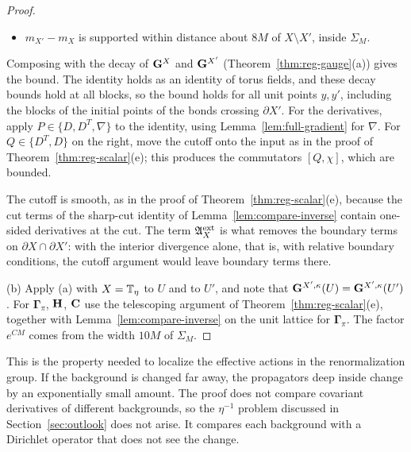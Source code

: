 \begin{proof}
\begin{itemize}
\[
[X_i^TM_iY_i,\chi]=[X_i^T,\chi]M_iY_i+X_i^T[M_i,\chi]Y_i+X_i^TM_i[Y_i,\chi].
\]
The commutators of $D$ and $D^T$ with $\chi$ are bounded and supported where $\partial\chi\ne0$. If $M_i$ has decay $(C,\gamma)$, then $\|\one_y[M_i,\chi]\one_{y'}\|\le2Ce^{-\gamma|y-y'|}$, and it vanishes unless $y$ or $y'$ lies within distance $3+\sqrt d$ of $X\setminus X'$; so $[M_i,\chi]$ has the seam form. The derivative $X_i^T$ on the left is absorbed by $\bG^{X'}$, since $\bG^{X'}D^T$ and $\bG^{X'}D$ decay (Theorem~\ref{thm:reg-gauge}(a)). The derivative $Y_i$ on the right falls on $u$, and $D\bG^X$, $D^T\bG^X$ decay. With $P$ on the left and $Q$ on the right, as below, the products $P\bG^{X'}X_i^T$ and $Y_i\bG^XQ$ also decay.
\item $m_{X'}-m_X$ is supported within distance about $8M$ of $X\setminus X'$, inside $\Sigma_M$.
\end{itemize}
Composing with the decay of $\mathbf G^X$ and $\bG^{X'}$ (Theorem~\ref{thm:reg-gauge}(a)) gives the bound. The identity holds as an identity of torus fields, and these decay bounds hold at all blocks, so the bound holds for all unit points $y,y'$, including the blocks of the initial points of the bonds crossing $\partial X'$. For the derivatives, apply $P\in\{D,D^T,\nabla\}$ to the identity, using Lemma~\ref{lem:full-gradient} for $\nabla$. For $Q\in\{D^T,D\}$ on the right, move the cutoff onto the input as in the proof of Theorem~\ref{thm:reg-scalar}(e); this produces the commutators $[Q,\chi]$, which are bounded.

The cutoff is smooth, as in the proof of Theorem~\ref{thm:reg-scalar}(e), because the cut terms of the sharp-cut identity of Lemma~\ref{lem:compare-inverse} contain one-sided derivatives at the cut. The term $\mathfrak A^{\rm ext}_X$ is what removes the boundary terms on $\partial X\cap\partial X'$: with the interior divergence alone, that is, with relative boundary conditions, the cutoff argument would leave boundary terms there.

(b) Apply (a) with $X=\mathbb T_\eta$ to $U$ and to $U'$, and note that $\mathbf G^{X',\kappa}(U)=\mathbf G^{X',\kappa}(U')$. For $\boldsymbol\Gamma_\pi$, $\mathbf H$, $\mathbf C$ use the telescoping argument of Theorem~\ref{thm:reg-scalar}(e), together with Lemma~\ref{lem:compare-inverse} on the unit lattice for $\boldsymbol\Gamma_\pi$. The factor $e^{CM}$ comes from the width $10M$ of $\Sigma_M$.
\end{proof}

This is the property needed to localize the effective actions in the renormalization group. If the background is changed far away, the propagators deep inside change by an exponentially small amount. The proof does not compare covariant derivatives of different backgrounds, so the $\eta^{-1}$ problem discussed in Section~\ref{sec:outlook} does not arise. It compares each background with a Dirichlet operator that does not see the change.

